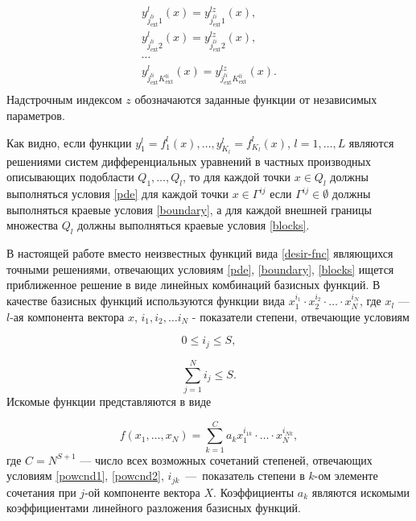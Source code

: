 \documentclass[a4paper,12pt]{article}
\begin{document}
\begin{equation}
    \begin{array}{ll}
        y^l_{j^{li}_{\text{ext} }1}(x)=
          y^{lz}_{j^{li}_{\text{ext} }1}(x),\\
        y^l_{j^{li}_{\text{ext} }2}(x)=
          y^{lz}_{j^{li}_{\text{ext} }2}(x),\\
        \cdots \\
        y^l_{j^{li}_{\text{ext}} K^{li}_{\text{ext}}}(x)=
        y^{lz}_{j^{li}_{\text{ext}} K^{li}_{\text{ext}}}(x).\\
    \end{array}
    \label{blocks}
\end{equation}
Надстрочным индексом $z$ обозначаются заданные функции от независимых
параметров.

Как видно, если функции $y^l_1=f^l_1(x),\ldots,y^l_{K_l}=f^l_{K_l}(x)$,
$l=1,\ldots,L$ являются решениями систем дифференциальных уравнений в
частных производных описывающих подобласти $Q_1,\ldots,Q_l$, то для
каждой точки $x \in Q_l$ должны выполняться условия \eqref{pde} для
каждой точки $x \in \Gamma^{ij}$ если $\Gamma^{ij} \in \emptyset$
должны выполняться краевые условия \eqref{boundary}, а для каждой 
внешней границы множества $Q_l$ должны выполняться краевые условия
\eqref{blocks}. 

В настоящей работе вместо неизвестных функций вида \eqref{desir-fnc}
являющихся точными решениями, отвечающих условиям \eqref{pde},
\eqref{boundary}, \eqref{blocks} ищется приближенное решение
в виде линейных комбинаций базисных функций. В качестве базисных функций
используются функции вида $x^{i_1}_1 \cdot x^{i_2}_2 \cdot \ldots \cdot
x^{i_N}_N$, где $x_l$ --- $l$-ая компонента вектора $x$, $i_1,i_2,\ldots
i_N$ - показатели степени, отвечающие условиям

\begin{equation}
    0 \le i_j \le S,
    \label{powcnd1}
\end{equation}

\begin{equation}
    \sum^{N}_{j=1} i_j \le S.
    \label{powcnd2}
\end{equation}
Искомые функции представляются в виде

\begin{equation}
    f(x_1,\ldots,x_N)=\sum^{C}_{k=1} a_kx^{i_{1k}}_1 
    \cdot\ldots\cdot x^{i_{Nk}}_N,
    \label{poly}
\end{equation}
где $C=N^{S+1}$ --- число всех возможных сочетаний степеней, отвечающих 
условиям \eqref{powcnd1}, \eqref{powcnd2}, $i_{jk}$~---~показатель степени
в $k$-ом элементе сочетания при $j$-ой компоненте вектора $X$. Коэффициенты
$a_k$ являются искомыми коэффициентами линейного разложения базисных 
функций.
\end{document}

